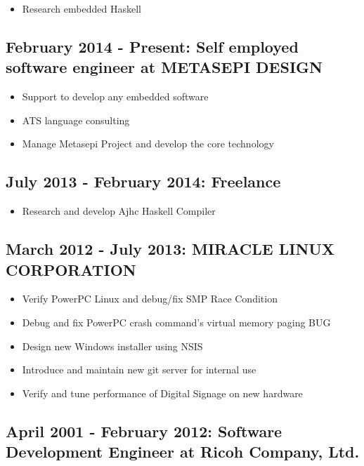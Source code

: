 \documentclass[letterpaper]{article}
\begin{document}
\begin{itemize}
  \item Research embedded Haskell
\end{itemize}

\subsection*{February 2014 - Present: Self employed software engineer at METASEPI DESIGN}

\begin{itemize}
  \item Support to develop any embedded software
  \item ATS language consulting
  \item Manage Metasepi Project and develop the core technology
\end{itemize}

\subsection*{July 2013 - February 2014: Freelance}

\begin{itemize}
  \item Research and develop Ajhc Haskell Compiler
\end{itemize}

\subsection*{March 2012 - July 2013: MIRACLE LINUX CORPORATION}

\begin{itemize}
  \item Verify PowerPC Linux and debug/fix SMP Race Condition
  \item Debug and fix PowerPC crash command's virtual memory paging BUG
  \item Design new Windows installer using NSIS
  \item Introduce and maintain new git server for internal use
  \item Verify and tune performance of Digital Signage on new hardware
\end{itemize}

\subsection*{April 2001 - February 2012: Software Development Engineer at Ricoh Company, Ltd.}
\end{document}
